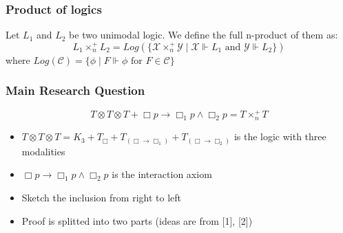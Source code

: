 \documentclass[hyperref={pdfpagelabels=false},t,10pt]{beamer}
\begin{document}
\begin{frame}
  \frametitle{Product of logics }
  \begin{definition}
    Let $L_1$ and $L_2$ be two unimodal logic. We define the full n-product of them as:
    $$L_1 \times_n^+ L_2 =  Log(\{\mathcal{X} \times_n^+ \mathcal{Y} \mid \mathcal{X} \Vdash L_1 \text{ and } \mathcal{Y} \Vdash L_2 \})$$   
    where $Log(\mathcal{C}) = \{\phi \mid F \Vdash \phi \text{ for } F \in \mathcal{C}\}$
  \end{definition}


\end{frame}


\begingroup


  \begin{frame}
    \frametitle{Main Research Question}
    \begin{theorem}
      $$T \otimes T \otimes T + \Box p \rightarrow \Box_1 p \land \Box_2 p
        = T \times_n^+ T$$
    \end{theorem} \pause

    \vspace{-0.25cm}

  \begin{itemize}
    \item $T \otimes T \otimes T = K_3 + T_{\Box} + T_{(\Box \rightarrow \Box_1)} + T_{(\Box \rightarrow \Box_2)}$ is the logic with three modalities 
    \item $\Box p \rightarrow \Box_1 p \land \Box_2 p$ is the interaction axiom \pause
    \item Sketch the inclusion from right to left
    \item Proof is splitted into two parts (ideas are from [1], [2])
  \end{itemize}
  \end{frame}
\endgroup
\end{document}
